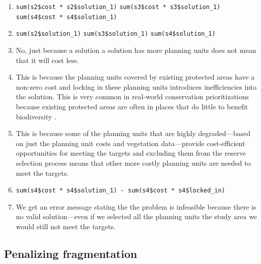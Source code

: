 \documentclass[
  12pt,
]{book}
\makeatletter
\providecommand{\tightlist}{%
  \setlength{\itemsep}{0pt}\setlength{\parskip}{0pt}}
\newenvironment{kframe}{%
\medskip{}
\setlength{\fboxsep}{.8em}
 \def\at@end@of@kframe{}%
 \ifinner\ifhmode%
  \def\at@end@of@kframe{\end{minipage}}%
  \begin{minipage}{\columnwidth}%
 \fi\fi%
 \def\FrameCommand##1{\hskip\@totalleftmargin \hskip-\fboxsep
 \colorbox{shadecolor}{##1}\hskip-\fboxsep
     \hskip-\linewidth \hskip-\@totalleftmargin \hskip\columnwidth}%
 \MakeFramed {\advance\hsize-\width
   \@totalleftmargin\z@ \linewidth\hsize
   \@setminipage}}%
 {\par\unskip\endMakeFramed%
 \at@end@of@kframe}
\newenvironment{rmdblock}[1]
  {
  \begin{itemize}
  \renewcommand{\labelitemi}{
    \raisebox{-.7\height}[0pt][0pt]{
      {\setkeys{Gin}{width=3em,keepaspectratio}\texttt{[image: images/\#1]}}
    }
  }
  \setlength{\fboxsep}{1em}
  \begin{kframe}
  \item
  }
  {
  \end{kframe}
  \end{itemize}
  }
\newenvironment{rmdanswer}
  {\begin{rmdblock}{answer}}
  {\end{rmdblock}}
\makeatother
\begin{document}
\begin{rmdanswer}
\begin{enumerate}
\def\labelenumi{\arabic{enumi}.}
\tightlist
\item
  \texttt{sum(s2\$cost\ *\ s2\$solution\_1)} \newline
  \texttt{sum(s3\$cost\ *\ s3\$solution\_1)} \newline
  \texttt{sum(s4\$cost\ *\ s4\$solution\_1)}
\item
  \texttt{sum(s2\$solution\_1)} \newline
  \texttt{sum(s3\$solution\_1)} \newline
  \texttt{sum(s4\$solution\_1)}
\item
  No, just because a solution a solution has more planning units does not mean that it will cost less.
\item
  This is because the planning units covered by existing protected areas have a non-zero cost and locking in these planning units introduces inefficiencies into the solution. This is very common in real-world conservation prioritizations because existing protected areas are often in places that do little to benefit biodiversity \citep{r3}.
\item
  This is because some of the planning units that are highly degraded---based on just the planning unit costs and vegetation data---provide cost-efficient opportunities for meeting the targets and excluding them from the reserve selection process means that other more costly planning units are needed to meet the targets.
\item
  \texttt{sum(s4\$cost\ *\ s4\$solution\_1)\ -\ sum(s4\$cost\ *\ s4\$locked\_in)}
\item
  We get an error message stating the the problem is infeasible because there is no valid solution---even if we selected all the planning units the study area we would still not meet the targets.
\end{enumerate}
\end{rmdanswer}

\hypertarget{penalizing-fragmentation-1}{%
\subsection{Penalizing fragmentation}\label{penalizing-fragmentation-1}}
\end{document}
